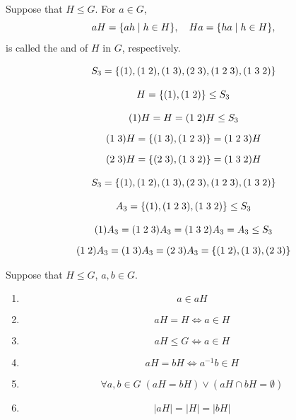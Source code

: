 
\begin{frame}
  \begin{definition}[Coset (陪集))]
    Suppose that $H \le G$.
    For $a \in G$,
    \[
      aH = \{ah \mid h \in H\}, \quad Ha = \{ha \mid h \in H\},
    \]
    is called the 
    and  of $H$ in $G$, respectively.
  \end{definition}
\end{frame}

\begin{frame}
  \[
    S_{3} = \{(1), (1\; 2), (1\; 3), (2\; 3), (1\; 2\; 3), (1\; 3\; 2)\}
  \]

  \[
    H = \{(1), (1\; 2)\} \le S_{3}
  \]

  \pause
  \begin{gather*}
    (1) H = H = (1\; 2) H \le S_{3} \\[6pt]
    (1\; 3) H = \{(1\; 3), (1\; 2\; 3)\} = (1\; 2\; 3)H \\[6pt]
    (2\; 3) H = \{(2\; 3), (1\; 3\; 2)\} = (1\; 3\; 2)H
  \end{gather*}
\end{frame}

\begin{frame}
  \[
    S_{3} = \{(1), (1\; 2), (1\; 3), (2\; 3), (1\; 2\; 3), (1\; 3\; 2)\}
  \]

  \[
    A_{3} = \{(1), (1\; 2\; 3), (1\; 3\; 2)\} \le S_{3}
  \]

  \pause
  \begin{gather*}
    (1)A_{3} = (1\;2\;3)A_{3} = (1\;3\;2)A_{3} = A_{3} \le S_{3} \\[6pt]
    (1\;2) A_{3} = (1\;3)A_{3} = (2\;3)A_{3} = \{(1\;2), (1\;3), (2\;3)\}
  \end{gather*}
\end{frame}

\begin{frame}{}
  \begin{theorem}
    Suppose that $H \le G$, $a, b \in G$.
    \begin{enumerate}[(1)]
      \item
        \[
          a \in aH
        \]
      \item
        \[
          aH = H \iff a \in H
        \]
      \item
        \[
          aH \le G \iff a \in H
        \]
      \item
        \[
          aH = bH \iff a^{-1}b \in H
        \]
      \item
        \[
          \forall a, b \in G\; (aH = bH) \lor (aH \cap bH = \emptyset)
        \]
      \item
        \[
          |aH| = |H| = |bH|
        \]
    \end{enumerate}
  \end{theorem}
\end{frame}

